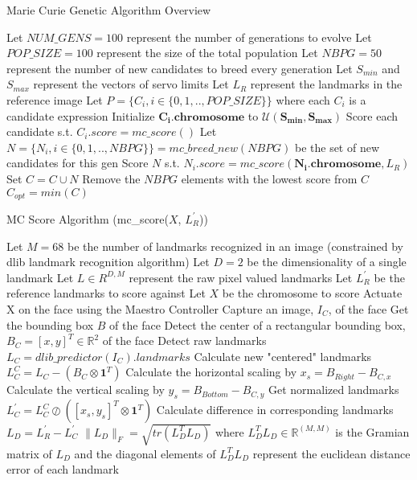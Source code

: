 \documentclass{article}
\begin{document}
\begin{algorithm}
	\caption{Marie Curie Genetic Algorithm Overview} 
    \begin{algorithmic}[1]
        \State Let $NUM\_GENS = 100$ represent the number of generations to evolve
        \State Let $POP\_SIZE = 100$ represent the size of the total population
		\State Let $NBPG = 50$ represent the number of new candidates to breed every generation
		\State Let $S_{min}$ and $S_{max}$ represent the vectors of servo limits
		\State Let $L_R$ represent the landmarks in the reference image
		\State Let $P = \{C_i, i \in \{0, 1, .., POP\_SIZE\}\}$ where each $C_i$ is a candidate expression
			\State Initialize $\mathbf{C_i.chromosome}$ to $\mathcal{U}(\bm{S_{min}}, \bm{S_{max}})$
			\State Score each candidate s.t. $C_i.score = mc\_score()$
		\EndFor
			\State Let $N = \{N_i, i \in \{0, 1, ..,NBPG\}\} = mc\_breed\_new(NBPG)$ be the set of new candidates for this gen
			\State Score $N$ s.t. $N_i.score = mc\_score(\mathbf{N_i.chromosome}, L_R)$
			\State Set $C = C \cup N$
			\State Remove the $NBPG$ elements with the lowest score from $C$ 
		\EndFor
		\State \Return $C_{opt} = min(C)$
	\end{algorithmic} 
\end{algorithm}

\begin{algorithm}
	\caption{MC Score Algorithm (mc\_score($X$, $L^\prime_R$))} 
	\begin{algorithmic}[1]
		\State Let $M = 68$ be the number of landmarks recognized in an image (constrained by dlib landmark recognition algorithm)
		\State Let $D = 2$ be the dimensionality of a single landmark
		\State Let $L \in R^{D, M}$ represent the raw pixel valued landmarks
		\State Let $L^\prime_R$ be the reference landmarks to score against
		\State Let $X$ be the chromosome to score
		\State Actuate X on the face using the Maestro Controller
		\State Capture an image, $I_C$, of the face
		\State Get the bounding box $B$ of the face
		\State Detect the center of a rectangular bounding box, $B_C = [x, y]^T \in \mathbb{R}^2$ of the face
		\State Detect raw landmarks $L_C = dlib\_predictor(I_C).landmarks$
		\State Calculate new "centered" landmarks $L^C_C = L_C - (B_C \otimes \mathbf{1}^T)$
		\State Calculate the horizontal scaling by $x_s = B_{Right} - B_{C, x}$
		\State Calculate the vertical scaling by $y_s = B_{Bottom} - B_{C, y}$
		\State Get normalized landmarks $L^\prime_C = L^C_C \oslash ([x_s, y_s]^T \otimes \mathbf{1}^T)$
		\State Calculate difference in corresponding landmarks $L_D = L^\prime_R - L^\prime_C$
		\State \Return $\| L_D \|_F = \sqrt{tr(L^T_DL_D)}$ where $L^T_DL_D \in \mathbb{R}^{(M, M)}$ is the Gramian matrix of $L_D$ and the diagonal elements of $L^T_DL_D$ represent the euclidean distance error of each landmark
	\end{algorithmic}
\end{algorithm}
\end{document}

